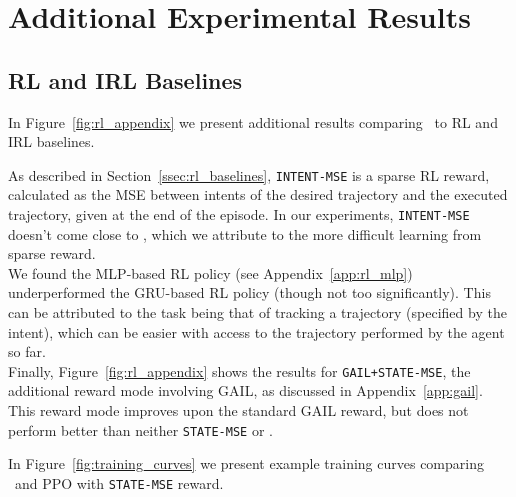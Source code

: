 \documentclass[nohyperref]{article}
\begin{document}
\newpage

\section{Additional Experimental Results}

\subsection{RL and IRL Baselines}
\label{app:rl_irl_baselines}
In Figure~\ref{fig:rl_appendix} we present additional results comparing \methodname\ to RL and IRL baselines.

As described in Section~\ref{ssec:rl_baselines}, \texttt{INTENT-MSE} is a sparse RL reward, calculated as the MSE between intents of the desired trajectory and the executed trajectory, given at the end of the episode. In our experiments, \texttt{INTENT-MSE} doesn't come close to \methodname, which we attribute to the more difficult learning from sparse reward. \\ 
We found the MLP-based RL policy (see Appendix~\ref{app:rl_mlp}) underperformed the GRU-based RL policy (though not too significantly). This can be attributed to the task being that of tracking a trajectory (specified by the intent), which can be easier with access to the trajectory performed by the agent so far. \\
Finally, Figure~\ref{fig:rl_appendix} shows the results for \texttt{GAIL+STATE-MSE}, the additional reward mode involving GAIL, as discussed in Appendix~\ref{app:gail}. This reward mode improves upon the standard GAIL reward, but does not perform better than neither \texttt{STATE-MSE} or \methodname.

In Figure~\ref{fig:training_curves} we present example training curves comparing \methodname\ and PPO with \texttt{STATE-MSE} reward.
\end{document}
